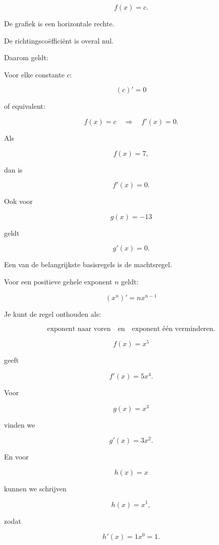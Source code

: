 \documentclass{ximera}
\begin{document}
\[
f(x)=c.
\]

De grafiek is een horizontale rechte.

De richtingscoëfficiënt is overal nul.

Daarom geldt:

\begin{eigenschap}

Voor elke constante $c$:

\[
\boxed{
(c)'=0
}
\]

of equivalent:

\[
f(x)=c
\quad\Longrightarrow\quad
f'(x)=0.
\]

\end{eigenschap}


\begin{voorbeeld}

Als

\[
f(x)=7,
\]

dan is

\[
f'(x)=0.
\]

Ook voor

\[
g(x)=-13
\]

geldt

\[
g'(x)=0.
\]

\end{voorbeeld}




Een van de belangrijkste basisregels is de machtsregel.

\begin{eigenschap}[Machtsregel]

Voor een positieve gehele exponent $n$ geldt:

\[
\boxed{
(x^n)'=n x^{n-1}
}
\]

\end{eigenschap}


Je kunt de regel onthouden als:

\[
\boxed{
\text{exponent naar voren}
\quad\text{en}\quad
\text{exponent één verminderen}.
}
\]


\begin{voorbeeld}

\[
f(x)=x^5
\]

geeft

\[
f'(x)=5x^4.
\]

Voor

\[
g(x)=x^3
\]

vinden we

\[
g'(x)=3x^2.
\]

En voor

\[
h(x)=x
\]

kunnen we schrijven

\[
h(x)=x^1,
\]

zodat

\[
h'(x)=1x^0=1.
\]

\end{voorbeeld}
\end{document}
